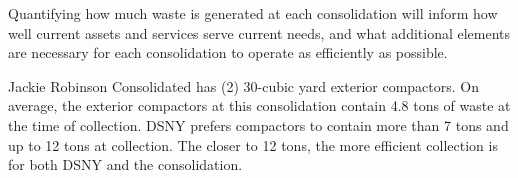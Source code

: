 
    Quantifying how much waste is generated at each consolidation will inform how well current assets and services serve current needs, and what additional elements are necessary for each consolidation to operate as efficiently as possible.
    
    Jackie Robinson Consolidated has (2) 30-cubic yard exterior compactors. On average, the exterior compactors at this consolidation contain 4.8 tons of waste at the time of collection. DSNY prefers compactors to contain more than 7 tons and up to 12 tons at collection. The closer to 12 tons, the more efficient collection is for both DSNY and the consolidation.